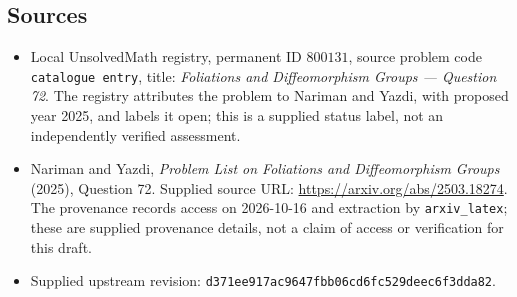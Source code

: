 \documentclass[11pt]{article}
\begin{document}
\subsection{Sources}
\begin{itemize}
\item Local UnsolvedMath registry, permanent ID \(800131\), source problem code \texttt{catalogue entry}, title: \emph{Foliations and Diffeomorphism Groups --- Question 72}. The registry attributes the problem to Nariman and Yazdi, with proposed year 2025, and labels it open; this is a supplied status label, not an independently verified assessment.
\item Nariman and Yazdi, \emph{Problem List on Foliations and Diffeomorphism Groups} (2025), Question 72. Supplied source URL: \url{https://arxiv.org/abs/2503.18274}. The provenance records access on 2026-10-16 and extraction by \texttt{arxiv\_latex}; these are supplied provenance details, not a claim of access or verification for this draft.
\item Supplied upstream revision: \texttt{d371ee917ac9647fbb06cd6fc529deec6f3dda82}.
\end{itemize}
\end{document}
